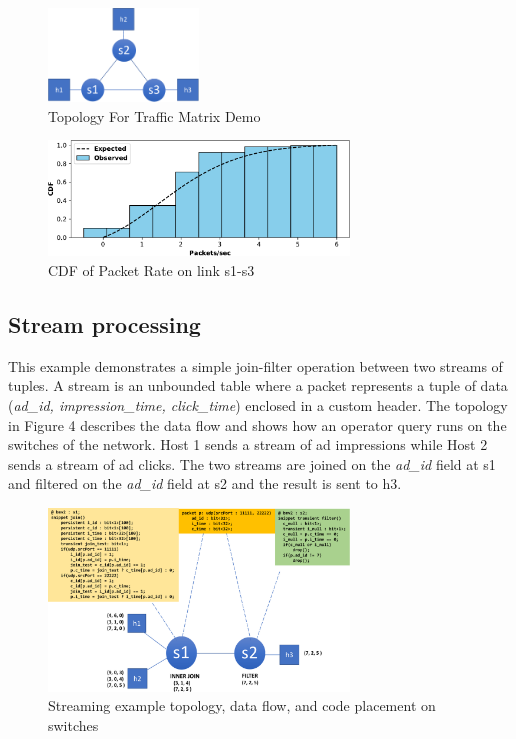 \begin{figure}[tp]
\centering
\includegraphics[width=40mm,scale=0.7]{figures/traf_mat_topo}
\caption{Topology For Traffic Matrix Demo}
\end{figure}


\begin{figure}[tp]
\centering
\includegraphics[width=80mm,scale=0.7]{figures/exp_obs_cdf}
\caption{CDF of Packet Rate on link s1-s3}
\end{figure}
  
\subsection{Stream processing}
This example demonstrates a simple join-filter operation between two streams of
tuples. A stream is an unbounded table where a packet represents a tuple of
data (\textit{ad\_id, impression\_time, click\_time}) enclosed in a custom
header. The topology in Figure 4 describes the data flow and shows how an
operator query runs on the switches of the network. Host 1 sends a stream of ad
impressions while Host 2 sends a stream of ad clicks. The two streams are
joined on the \textit{ad\_id} field at s1 and filtered on the \textit{ad\_id}
field at s2 and the result is sent to h3. 

\begin{figure}[tp]
\centering
\includegraphics[width=80mm,scale=0.7]{figures/streaming_example}
\caption{Streaming example topology, data flow, and code placement on switches}
\vspace{-5mm}
\end{figure}
\vspace{-5mm}


